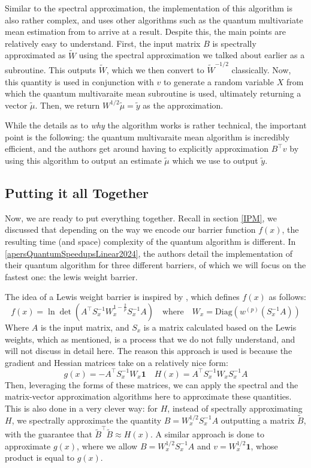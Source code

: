 \documentclass[11pt]{article}
\begin{document}
Similar to the spectral approximation, the implementation of this algorithm is also rather complex, and uses 
other algorithms such as the quantum multivariate mean estimation from 
\cite{cornelissenNearOptimalQuantumAlgorithms2022} to arrive at a result. Despite this, the main points 
are relatively easy to understand. First, the input matrix \( B \) is spectrally approximated as \( \tilde W \) 
using the spectral approximation we talked about earlier as a subroutine. This outputs \( \tilde W \), which we then 
convert to \( \tilde W^{ - 1 / 2} \) classically. Now, this quantity is used in conjunction with \( v \) to 
generate a random variable \( X \) from which the quantum multivaraite mean subroutine is used, ultimately 
returning a vector \( \tilde \mu \). Then, we return \( W^{ 1 / 2} \tilde \mu = \tilde y\) as the approximation. 

While the details as to \textit{why} the algorithm works is rather technical, the important point is the following: 
the quantum multivaraite mean algorithm is incredibly efficient, and the authors get around having to 
explicitly approximation \( B^{\top} v \) by using this algorithm to output an estimate \( \tilde \mu \) which 
we use to output \( \tilde y \). 
 

\subsection{Putting it all Together}
Now, we are ready to put everything together. Recall in section \ref{IPM}, we discussed that depending on the way 
we encode our barrier function \( f(x) \), the resulting time (and space) complexity of the quantum algorithm is 
different. In \ref{apersQuantumSpeedupsLinear2024}, the authors detail the implementation of their quantum 
algorithm for three different barriers, of which we will focus on the fastest one: the lewis weight barrier. 
   
The idea of a Lewis weight barrier is inspired by \cite{leeSolvingLinearPrograms}, which defines \( f(x) \) 
as follows:
\[
f(x) = \ln \det(A^{\top}S_x^{-1} W_x^{1 - \frac{2}{p}}S_x^{-1}A) \quad \text{where}\quad 
W_x = \mathrm{Diag}(w^{(p)}(S_x^{-1}A))
\] 
Where \( A \) is the input matrix, and \( S_x \) is a matrix calculated based on the Lewis weights, which as 
mentioned, is a process that we do not fully understand, and will not discuss in detail here. The reason 
this approach is used is because the gradient and Hessian matrices take on a relatively nice form:
\[
	g(x) = -A^{\top} S_x^{-1} W_x \mathbf{1} \quad H(x) = A^{\top} S_x^{-1}W_x S_x ^{-1} A
\] 
Then, leveraging the forms of these matrices, we can apply the spectral and the matrix-vector 
approximation algorithms here to approximate these quantities. This is also done in a very clever way: for \( H \), 
instead of spectrally approximating \( H \), we spectrally approximate the quantity \(B = W_x^{1 / 2}S_x^{-1} A \)
outputting a matrix \( \tilde B \), with the guarantee that \( \tilde B^{\top} \tilde B \approx H(x) \). A similar 
approach is done to approximate \( g(x) \), where we allow \( B = W_x^{1 / 2}S_x^{-1}A \) and 
\( v = W_x^{1 / 2} \mathbf 1 \), whose product is equal to \( g(x) \). 
\end{document}
